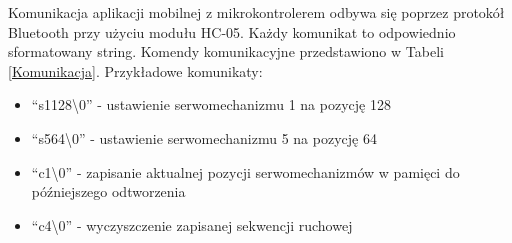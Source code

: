 \documentclass[11pt,titlepage,a4paper]{article}
\begin{document}
Komunikacja aplikacji mobilnej z mikrokontrolerem odbywa się poprzez protokół Bluetooth przy użyciu modułu HC-05. Każdy komunikat to odpowiednio sformatowany string. Komendy komunikacyjne przedstawiono w Tabeli \ref{Komunikacja}. Przykładowe komunikaty:
\begin{itemize}
    \item \enquote{s1128\textbackslash0} - ustawienie serwomechanizmu 1 na pozycję 128
    \item \enquote{s564\textbackslash0} - ustawienie serwomechanizmu 5 na pozycję 64
    \item \enquote{c1\textbackslash0} - zapisanie aktualnej pozycji serwomechanizmów w pamięci do późniejszego odtworzenia
    \item \enquote{c4\textbackslash0} - wyczyszczenie zapisanej sekwencji ruchowej
\end{itemize}

\vspace{2cm}
\end{document}
